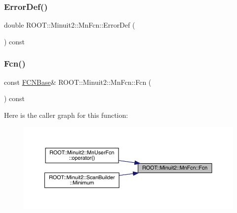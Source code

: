 \mbox{\label{classROOT_1_1Minuit2_1_1MnFcn_abca32e4dd5ef187be7e099df14b4b54a}} 
\subsubsection{\texorpdfstring{ErrorDef()}{ErrorDef()}\hspace{0.1cm}{\footnotesize\ttfamily [3/3]}}
{\footnotesize\ttfamily double R\+O\+O\+T\+::\+Minuit2\+::\+Mn\+Fcn\+::\+Error\+Def (\begin{DoxyParamCaption}{ }\end{DoxyParamCaption}) const}

\mbox{\label{classROOT_1_1Minuit2_1_1MnFcn_a667fd993a6bb4832e6e70b7eaaca9fa4}} 
\subsubsection{\texorpdfstring{Fcn()}{Fcn()}\hspace{0.1cm}{\footnotesize\ttfamily [1/3]}}
{\footnotesize\ttfamily const \mbox{\hyperlink{classROOT_1_1Minuit2_1_1FCNBase}{F\+C\+N\+Base}}\& R\+O\+O\+T\+::\+Minuit2\+::\+Mn\+Fcn\+::\+Fcn (\begin{DoxyParamCaption}{ }\end{DoxyParamCaption}) const\hspace{0.3cm}{\ttfamily [inline]}}

Here is the caller graph for this function\+:
\nopagebreak
\begin{figure}[H]
\begin{center}
\leavevmode
\includegraphics[width=350pt]{de/d0e/classROOT_1_1Minuit2_1_1MnFcn_a667fd993a6bb4832e6e70b7eaaca9fa4_icgraph}
\end{center}
\end{figure}
\mbox{\label{classROOT_1_1Minuit2_1_1MnFcn_a667fd993a6bb4832e6e70b7eaaca9fa4}} 
